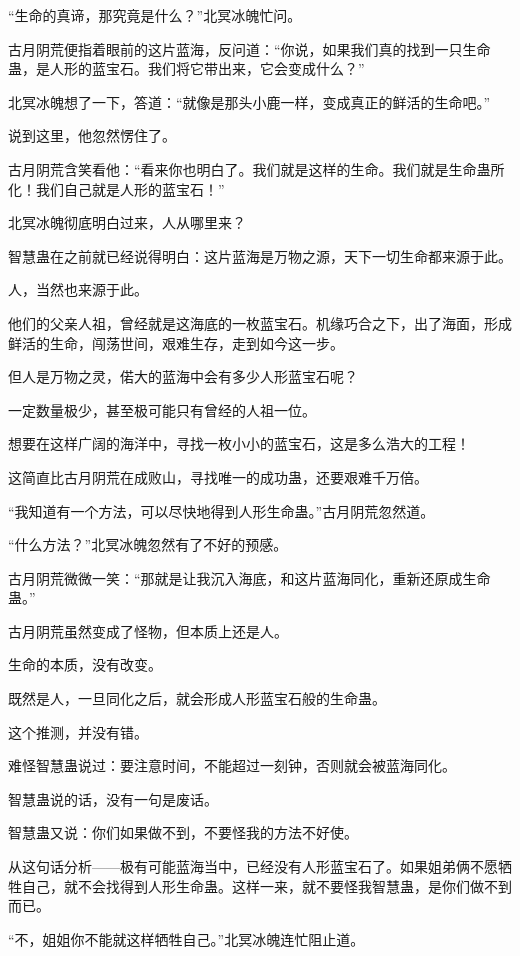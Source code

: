\begin{this_body}
“生命的真谛，那究竟是什么？”北冥冰魄忙问。

古月阴荒便指着眼前的这片蓝海，反问道：“你说，如果我们真的找到一只生命蛊，是人形的蓝宝石。我们将它带出来，它会变成什么？”

北冥冰魄想了一下，答道：“就像是那头小鹿一样，变成真正的鲜活的生命吧。”

说到这里，他忽然愣住了。

古月阴荒含笑看他：“看来你也明白了。我们就是这样的生命。我们就是生命蛊所化！我们自己就是人形的蓝宝石！”

北冥冰魄彻底明白过来，人从哪里来？

智慧蛊在之前就已经说得明白：这片蓝海是万物之源，天下一切生命都来源于此。

人，当然也来源于此。

他们的父亲人祖，曾经就是这海底的一枚蓝宝石。机缘巧合之下，出了海面，形成鲜活的生命，闯荡世间，艰难生存，走到如今这一步。

但人是万物之灵，偌大的蓝海中会有多少人形蓝宝石呢？

一定数量极少，甚至极可能只有曾经的人祖一位。

想要在这样广阔的海洋中，寻找一枚小小的蓝宝石，这是多么浩大的工程！

这简直比古月阴荒在成败山，寻找唯一的成功蛊，还要艰难千万倍。

“我知道有一个方法，可以尽快地得到人形生命蛊。”古月阴荒忽然道。

“什么方法？”北冥冰魄忽然有了不好的预感。

古月阴荒微微一笑：“那就是让我沉入海底，和这片蓝海同化，重新还原成生命蛊。”

古月阴荒虽然变成了怪物，但本质上还是人。

生命的本质，没有改变。

既然是人，一旦同化之后，就会形成人形蓝宝石般的生命蛊。

这个推测，并没有错。

难怪智慧蛊说过：要注意时间，不能超过一刻钟，否则就会被蓝海同化。

智慧蛊说的话，没有一句是废话。

智慧蛊又说：你们如果做不到，不要怪我的方法不好使。

从这句话分析——极有可能蓝海当中，已经没有人形蓝宝石了。如果姐弟俩不愿牺牲自己，就不会找得到人形生命蛊。这样一来，就不要怪我智慧蛊，是你们做不到而已。

“不，姐姐你不能就这样牺牲自己。”北冥冰魄连忙阻止道。


\end{this_body}
